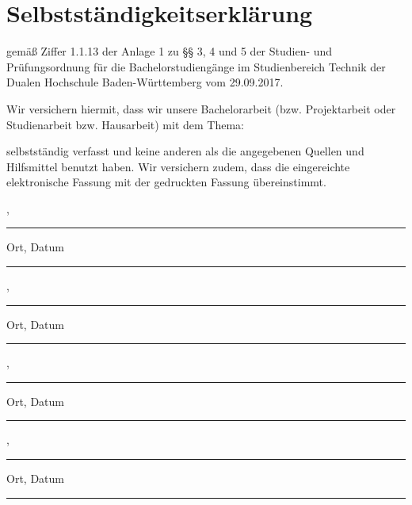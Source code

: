 \thispagestyle{empty}
\section*{\Huge{Selbstständigkeitserklärung}}

gemäß Ziffer 1.1.13 der Anlage 1 zu §§ 3, 4 und 5  der Studien- und Prüfungsordnung für die Bachelorstudiengänge im Studienbereich Technik der Dualen Hochschule Baden-Würt­tem­berg vom 29.09.2017.

\noindent Wir versichern hiermit, dass wir unsere Bachelorarbeit (bzw. Projektarbeit oder Studienarbeit bzw. Hausarbeit) mit dem Thema: 
\begin{center}
	\Large\textbf{\vTitel}
\end{center}
selbstständig verfasst und keine anderen als die angegebenen Quellen und Hilfsmittel benutzt haben. Wir versichern zudem, dass die eingereichte elektronische Fassung mit der gedruckten Fassung übereinstimmt.

\vfill
\leavevmode
\newline
\parbox{7cm}{\strut\centering \vBearbeitungsort, \vAbgabedatum\hrule\strut\centering\footnotesize Ort, Datum} 
\hfill
\parbox{7cm}{\strut\hspace{1pt} \hrule\strut\centering\footnotesize \vJB}
\newline
\vspace{1cm}
\newline
\parbox{7cm}{\strut\centering \vBearbeitungsort, \vAbgabedatum\hrule\strut\centering\footnotesize Ort, Datum} 
\hfill
\parbox{7cm}{\strut\hspace{1pt} \hrule\strut\centering\footnotesize \vLB}
\newline
\vspace{1cm}
\newline
\parbox{7cm}{\strut\centering \vBearbeitungsort, \vAbgabedatum\hrule\strut\centering\footnotesize Ort, Datum} 
\hfill
\parbox{7cm}{\strut\hspace{1pt} \hrule\strut\centering\footnotesize \vPP}
\newline
\vspace{1cm}
\newline
\parbox{7cm}{\strut\centering \vBearbeitungsort, \vAbgabedatum\hrule\strut\centering\footnotesize Ort, Datum} 
\hfill
\parbox{7cm}{\strut\hspace{1pt} \hrule\strut\centering\footnotesize \vHS}
\newpage